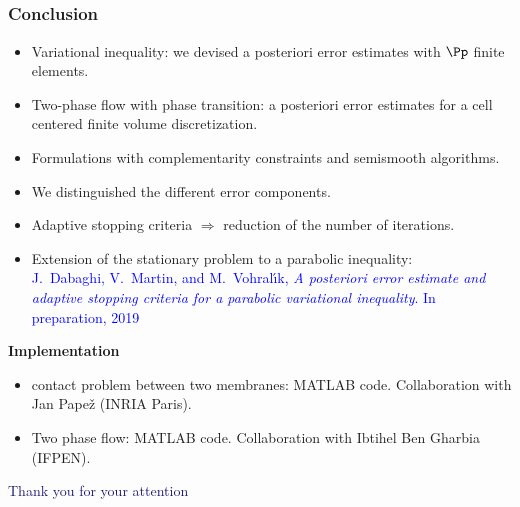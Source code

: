 \documentclass[aspectratio=169]{beamer}
\begin{document}
\subsection{}
\begin{frame}
\frametitle{Conclusion}
\begin{itemize}
\item
 Variational inequality: we devised a posteriori error estimates with $\Pp$ finite elements.
\item
 Two-phase flow with phase transition: a posteriori error estimates for a cell centered finite volume discretization. 
\item
Formulations with complementarity constraints and semismooth algorithms.
\item
 We distinguished the different error components.
\item Adaptive stopping criteria $\Rightarrow$ reduction of the number of iterations. 
\item
Extension of the stationary problem to a parabolic inequality:
\\
 \scriptsize{\textcolor{blue}{
 {\sc J.~Dabaghi, V.~Martin, and M.~Vohral{\'{\i}}k}, {\em A posteriori error estimate and adaptive stopping criteria for a parabolic variational inequality}. In preparation, 2019
 }}
\end{itemize}
\textcolor{cadmiumgreen}{\textbf{Implementation}}
\begin{itemize}
\item contact problem between two membranes: MATLAB code. Collaboration with Jan Pape{\v z} (INRIA Paris).
\item Two phase flow: MATLAB code. Collaboration with Ibtihel Ben Gharbia (IFPEN).
\end{itemize}
\end{frame}
%
\begin{frame}
\centering
\Huge{\textcolor{midnightblue}{Thank you for your attention}}
\end{frame}
\end{document}
